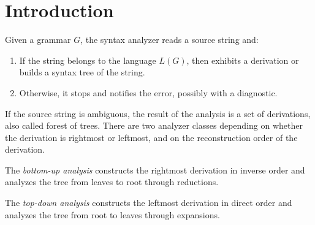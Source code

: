 \section{Introduction}

Given a grammar $G$, the syntax analyzer reads a source string and: 
\begin{enumerate}
    \item If the string belongs to the language $L(G)$, then exhibits a derivation or builds a syntax tree of the string. 
    \item Otherwise, it stops and notifies the error, possibly with a diagnostic.
\end{enumerate}
If the source string is ambiguous, the result of the analysis is a set of derivations, also called forest of trees. 
There are two analyzer classes depending on whether the derivation is rightmost or leftmost, and on the reconstruction order of the derivation. 
\begin{definition}
    The \emph{bottom-up analysis} constructs the rightmost derivation in inverse order and analyzes the tree from leaves to root through reductions. 

    The \emph{top-down analysis} constructs the leftmost derivation in direct order and analyzes the tree from root to leaves through expansions. 
\end{definition}
